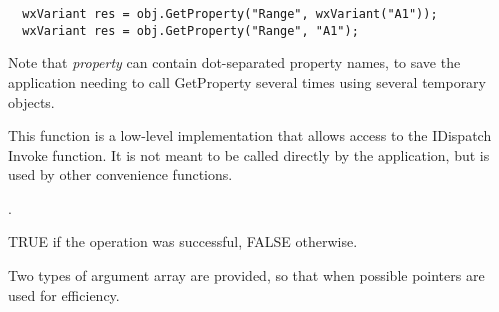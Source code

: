 {\small
\begin{verbatim}
  wxVariant res = obj.GetProperty("Range", wxVariant("A1"));
  wxVariant res = obj.GetProperty("Range", "A1");
\end{verbatim}
}

Note that {\it property} can contain dot-separated property names, to save the application
needing to call GetProperty several times using several temporary objects.

\label{wxautomationobjectinvoke}


This function is a low-level implementation that allows access to the IDispatch Invoke function.
It is not meant to be called directly by the application, but is used by other convenience functions.




.





TRUE if the operation was successful, FALSE otherwise.


Two types of argument array are provided, so that when possible pointers are used for efficiency.

\label{wxautomationobjectputproperty}




